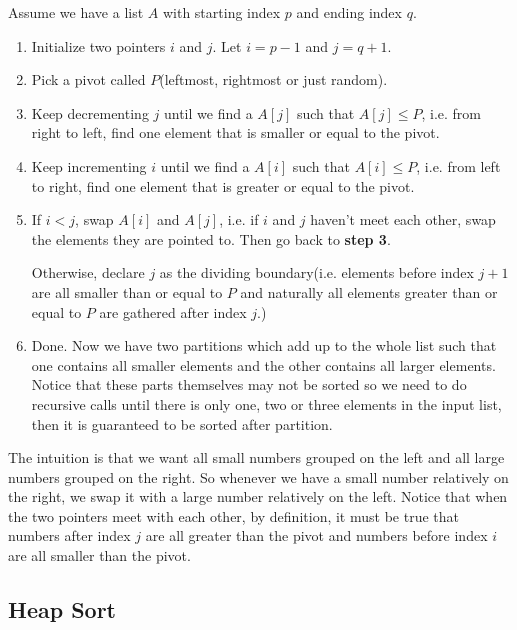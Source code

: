 \documentclass{ainote}
\begin{document}
Assume we have a list $A$ with starting index $p$ and ending index $q$.
\begin{enumerate}
    \item Initialize two pointers $i$ and $j$. Let $i=p-1$ and $j=q+1$.
    \item Pick a pivot called $P$(leftmost, rightmost or just random).
    \item Keep decrementing $j$ until we find a $A[j]$ such that $A[j]\le P$, i.e. from right to left, find one element that is smaller or equal to the pivot.
    \item Keep incrementing $i$ until we find a $A[i]$ such that $A[i]\le P$, i.e. from left to right, find one element that is greater or equal to the pivot.
    \item If $i<j$, swap $A[i]$ and $A[j]$, i.e. if $i$ and $j$ haven't meet each other, swap the elements they are pointed to. Then go back to \textbf{step 3}.
    
    Otherwise, declare $j$ as the dividing boundary(i.e. elements before index $j+1$ are all smaller than or equal to $P$ and naturally all elements greater than or equal to $P$ are gathered after index $j$.)
    \item Done. Now we have two partitions which add up to the whole list such that one contains all smaller elements and the other contains all larger elements. Notice that these parts themselves may not be sorted so we need to do recursive calls until there is only one, two or three elements in the input list, then it is guaranteed to be sorted after partition.
\end{enumerate}
\begin{info}
    The intuition is that we want all small numbers grouped on the left and all large numbers grouped on the right. So whenever we have a small number relatively on the right, we swap it  with a large number relatively on the left. Notice that when the two pointers meet with each other, by definition, it must be true that numbers after index $j$ are all greater than the pivot and numbers before index $i$ are all smaller than the pivot.
\end{info}


\subsection{Heap Sort}
\end{document}
